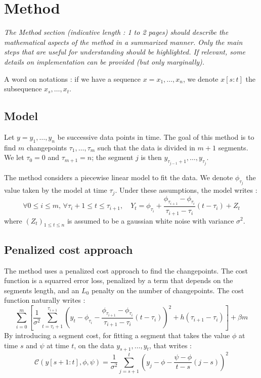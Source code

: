 \documentclass[11pt]{article}
\begin{document}
\section{Method}

\textit{
    The Method section (indicative length : 1 to 2 pages) should describe the mathematical aspects of the method in a summarized manner. Only the main steps that are useful for understanding should be highlighted. If relevant, some details on implementation can be provided (but only marginally).
}

A word on notations : if we have a sequence $x=x_1,\dots,x_n$, we denote $x[s:t]$ the subsequence $x_s,\dots,x_t$.

\subsection{Model}

Let $y=y_1, \dots, y_n$ be successive data points in time. The goal of this method is to find $m$ changepoints $\tau_1,\dots,\tau_m$ such that the data is divided in $m+1$ segments. We let $\tau_0=0$ and $\tau_{m+1}=n$; the segment $j$ is then $y_{\tau_{j-1}+1},\dots,y_{\tau_j}$.

The method considers a piecewise linear model to fit the data. We denote $\phi_{\tau_j}$ the value taken by the model at time $\tau_j$. Under these assumptions, the model writes :
\begin{equation}
    \forall 0\leq i\leq m,\,\forall \tau_i+1\leq t\leq \tau_{i+1},\quad Y_t=\phi_{\tau_i}+\frac{\phi_{\tau_{i+1}}-\phi_{\tau_i}}{\tau_{i+1}-\tau_i}(t-\tau_i)+Z_t
\end{equation}
where $(Z_t)_{1\leq t\leq n}$ is assumed to be a gaussian white noise with variance $\sigma^2$.

\subsection{Penalized cost approach}

The method uses a penalized cost approach to find the changepoints. The cost function is a squarred error loss, penalized by a term that depends on the segments length, and an $L_0$ penalty on the number of changepoints. The cost function naturally writes :
\begin{equation}
    \sum_{i=0}^m \left[\frac{1}{\sigma^2}\sum_{t=\tau_i+1}^{\tau_{i+1}} \left(y_t-\phi_{\tau_i}-\frac{\phi_{\tau_{i+1}}-\phi_{\tau_i}}{\tau_{i+1}-\tau_i}(t-\tau_i)\right)^2 + h(\tau_{i+1}-\tau_i)\right]+\beta m
\end{equation}
By introducing a segment cost, for fitting a segment that takes the value $\phi$ at time $s$ and $\psi$ at time $t$, on the data $y_{s+1},\dots,y_t$, that writes :
\begin{equation}
    \mathcal{C}(y[s+1:t],\phi,\psi) = \frac{1}{\sigma^2}\sum_{j=s+1}^t \left(y_j-\phi-\frac{\psi-\phi}{t-s}(j-s)\right)^2
\end{equation}
\end{document}
